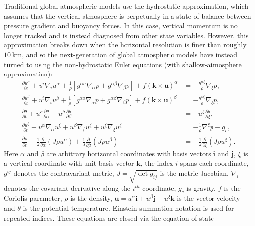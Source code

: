 \documentclass[11pt]{article}
\newcommand{\vb}{\mathbf}
\newcommand{\pdiff}[2]{\frac{\partial #1}{\partial #2}}
\begin{document}
Traditional global atmospheric models use the hydrostatic approximation, which assumes that the vertical atmosphere is perpetually in a state of balance between pressure gradient and buoyancy forces.  In this case, vertical momentum is no longer tracked and is instead diagnosed from other state variables.  However, this approximation breaks down when the horizontal resolution is finer than roughly $10\ \mbox{km}$, and so the next-generation of global atmospheric models have instead turned to using the non-hydrostatic Euler equations (with shallow-atmosphere approximation):
\begin{align}
\label{eq:NonhydroEqn1} \pdiff{u^\alpha}{t} + u^i \nabla_i u^\alpha + \frac{1}{\rho} \left[g^{\alpha \alpha} \nabla_\alpha p + g^{\alpha \beta} \nabla_\beta p \right] + f (\vb{k} \times \vb{u})^\alpha &= - \frac{g^{\alpha \xi}}{\rho} \nabla_\xi p, \\
\label{eq:NonhydroEqn2} \pdiff{u^\beta}{t} + u^i \nabla_i u^\beta + \frac{1}{\rho} \left[g^{\alpha \alpha} \nabla_\alpha p + g^{\alpha \beta} \nabla_\beta p \right]  + f (\vb{k} \times \vb{u})^\beta &=  - \frac{g^{\beta \xi}}{\rho} \nabla_\xi p, \\
\label{eq:NonhydroEqn3} \pdiff{\theta}{t} + u^\alpha \pdiff{\theta}{\alpha} + u^\beta \pdiff{\theta}{\beta} &= - u^\xi \pdiff{\theta}{\xi}, \\
\label{eq:NonhydroEqn4} \pdiff{u^\xi}{t} + u^\alpha \nabla_\alpha u^\xi + u^\beta \nabla_\beta u^\xi + u^\xi \nabla_\xi u^\xi &= - \frac{1}{\rho} \nabla^\xi p - g_c, \\
\label{eq:NonhydroEqn5} \pdiff{\rho}{t} + \frac{1}{J} \pdiff{}{\alpha} (J \rho u^\alpha) + \frac{1}{J} \pdiff{}{\beta} (J \rho u^\beta) &= - \frac{1}{J} \pdiff{}{\xi} (J \rho u^\xi).
\end{align}  Here $\alpha$ and $\beta$ are arbitrary horizontal coordinates with basis vectors $\vb{i}$ and $\vb{j}$, $\xi$ is a vertical coordinate with unit basis vector $\vb{k}$, the index $i$ spans each coordinate, $g^{ij}$ denotes the contravariant metric, $J = \sqrt{\det g_{ij}}$ is the metric Jacobian, $\nabla_i$ denotes the covariant derivative along the $i^{th}$ coordinate, $g_c$ is gravity, $f$ is the Coriolis parameter, $\rho$ is the density, $\vb{u} = u^\alpha \vb{i} + u^\beta \vb{j} + u^\xi \vb{k}$ is the vector velocity and $\theta$ is the potential temperature.  Einstein summation notation is used for repeated indices.  These equations are closed via the equation of state
\end{document}
